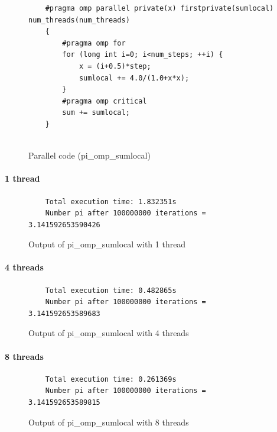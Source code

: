 \documentclass[12pt, a4paper]{article}
\begin{document}
\begin{figure}[H]
	\begin{lstlisting}
	#pragma omp parallel private(x) firstprivate(sumlocal) num_threads(num_threads)
    {
        #pragma omp for 
        for (long int i=0; i<num_steps; ++i) {
            x = (i+0.5)*step;
            sumlocal += 4.0/(1.0+x*x);
        }
        #pragma omp critical 
		sum += sumlocal;
    }


	\end{lstlisting}
	
	\caption{Parallel code (pi\_omp\_sumlocal)}
\end{figure}

\paragraph{1 thread}

\begin{figure}[H]
	\begin{lstlisting}
	Total execution time: 1.832351s
	Number pi after 100000000 iterations = 3.141592653590426		
	\end{lstlisting}
	\caption{Output of pi\_omp\_sumlocal with 1 thread}
\end{figure}

\paragraph{4 threads}

\begin{figure}[H]
	\begin{lstlisting}
	Total execution time: 0.482865s
	Number pi after 100000000 iterations = 3.141592653589683					
	\end{lstlisting}
	\caption{Output of pi\_omp\_sumlocal with 4 threads}
\end{figure}

\paragraph{8 threads}

\begin{figure}[H]
	\begin{lstlisting}
	Total execution time: 0.261369s
	Number pi after 100000000 iterations = 3.141592653589815		
	\end{lstlisting}
	\caption{Output of pi\_omp\_sumlocal with 8 threads}
\end{figure}
\end{document}
